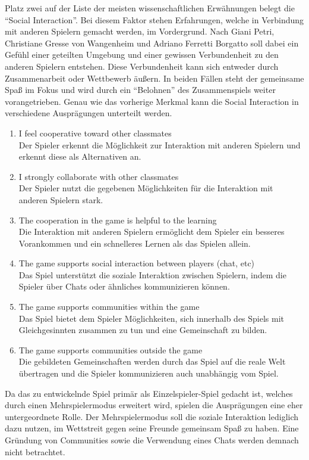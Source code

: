 	Platz zwei auf der Liste der meisten wissenschaftlichen Erwähnungen belegt die \enquote{Social Interaction}. Bei diesem Faktor stehen Erfahrungen, welche in Verbindung mit anderen Spielern gemacht werden, im Vordergrund. Nach Giani Petri, Christiane Gresse von Wangenheim und Adriano Ferretti Borgatto soll dabei ein Gefühl einer geteilten Umgebung und einer gewissen Verbundenheit zu den anderen Spielern entstehen. Diese Verbundenheit kann sich entweder durch Zusammenarbeit oder Wettbewerb äußern. In beiden Fällen steht der gemeinsame Spaß im Fokus und wird durch ein \enquote{Belohnen} des Zusammenspiels weiter vorangetrieben.
	Genau wie das vorherige Merkmal kann die Social Interaction in verschiedene Ausprägungen unterteilt werden.
	\begin{enumerate}
		\item{I feel cooperative toward other classmates}\hfill \\
		Der Spieler erkennt die Möglichkeit zur Interaktion mit anderen Spielern und erkennt diese als Alternativen an.
		\item{I strongly collaborate with other classmates}\hfill \\
		Der Spieler nutzt die gegebenen Möglichkeiten für die Interaktion mit anderen Spielern stark.
		\item{The cooperation in the game is helpful to the learning}\hfill \\
		Die Interaktion mit anderen Spielern ermöglicht dem Spieler ein besseres Vorankommen und ein schnelleres Lernen als das Spielen allein.
		\item{The game supports social interaction between players (chat, etc)}\hfill \\
		Das Spiel unterstützt die soziale Interaktion zwischen Spielern, indem die Spieler über Chats oder ähnliches kommunizieren können.
		\item{The game supports communities within the game}\hfill \\
		Das Spiel bietet dem Spieler Möglichkeiten, sich innerhalb des Spiels mit Gleichgesinnten zusammen zu tun und eine Gemeinschaft zu bilden.
		\item{The game supports communities outside the game}\hfill \\
		Die gebildeten Gemeinschaften werden durch das Spiel auf die reale Welt übertragen und die Spieler kommunizieren auch unabhängig vom Spiel.
	\end{enumerate}
	Da das zu entwickelnde Spiel primär als Einzelspieler-Spiel gedacht ist, welches durch einen Mehrspielermodus erweitert wird, spielen die Ausprägungen eine eher untergeordnete Rolle. Der Mehrspielermodus soll die soziale Interaktion lediglich dazu nutzen, im Wettstreit gegen seine Freunde gemeinsam Spaß zu haben. Eine Gründung von Communities sowie die Verwendung eines Chats werden demnach nicht betrachtet.

